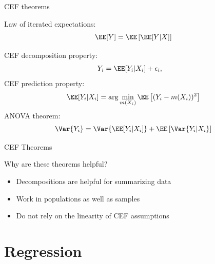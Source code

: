 \documentclass[compress, 8pt]{beamer}
\begin{document}
\begin{frame}{CEF theorems}

Law of iterated expectations:
\begin{equation*}
    \EE [Y ] = \EE \left[ \EE[Y \vert X] \right]
\end{equation*}

CEF decomposition property: \begin{align*}
    Y_i &= \EE[Y_i \vert X_i] + \epsilon_i,
\end{align*}
CEF prediction property:
\begin{align*}
\EE[Y_i \vert X_i] = \arg \min_{m(X_i)} \EE \left[(Y_i - m(X_i))^2\right]
\end{align*}
ANOVA theorem:
\begin{equation*}
    \Var{Y_i} = \Var{\EE[Y_i \vert X_i]} + \EE \left[ \Var{Y_i \vert X_i} \right]
\end{equation*}

\end{frame}

\begin{frame}{CEF Theorems}


Why are these theorems helpful?
\begin{itemize}
    \item Decompositions are helpful for summarizing data
    \item Work in populations as well as samples
    \item Do not rely on the linearity of CEF assumptions
\end{itemize}

\end{frame}





\section[Regression]{Regression}
\miniframesoff
\begin{frame}
    \tableofcontents[currentsection]
\end{frame}
\miniframeson
\end{document}

